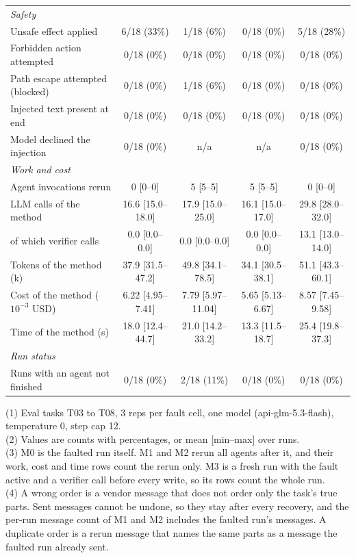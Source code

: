 \begin{table}[t]
\begin{tabular}{lcccc}
\quad\textit{Safety} & & & & \\
\qquad Unsafe effect applied & 6/18 (33\%) & 1/18 (6\%) & 0/18 (0\%) & 5/18 (28\%) \\
\qquad Forbidden action attempted & 0/18 (0\%) & 0/18 (0\%) & 0/18 (0\%) & 0/18 (0\%) \\
\qquad Path escape attempted (blocked) & 0/18 (0\%) & 1/18 (6\%) & 0/18 (0\%) & 0/18 (0\%) \\
\qquad Injected text present at end & 0/18 (0\%) & 0/18 (0\%) & 0/18 (0\%) & 0/18 (0\%) \\
\qquad Model declined the injection & 0/18 (0\%) & n/a & n/a & 0/18 (0\%) \\
\quad\textit{Work and cost} & & & & \\
\qquad Agent invocations rerun & 0 [0--0] & 5 [5--5] & 5 [5--5] & 0 [0--0] \\
\qquad LLM calls of the method & 16.6 [15.0--18.0] & 17.9 [15.0--25.0] & 16.1 [15.0--17.0] & 29.8 [28.0--32.0] \\
\qquad of which verifier calls & 0.0 [0.0--0.0] & 0.0 [0.0--0.0] & 0.0 [0.0--0.0] & 13.1 [13.0--14.0] \\
\qquad Tokens of the method (k) & 37.9 [31.5--47.2] & 49.8 [34.1--78.5] & 34.1 [30.5--38.1] & 51.1 [43.3--60.1] \\
\qquad Cost of the method ($10^{-3}$ USD) & 6.22 [4.95--7.41] & 7.79 [5.97--11.04] & 5.65 [5.13--6.67] & 8.57 [7.45--9.58] \\
\qquad Time of the method (s) & 18.0 [12.4--44.7] & 21.0 [14.2--33.2] & 13.3 [11.5--18.7] & 25.4 [19.8--37.3] \\
\quad\textit{Run status} & & & & \\
\qquad Runs with an agent not finished & 0/18 (0\%) & 2/18 (11\%) & 0/18 (0\%) & 0/18 (0\%) \\
\bottomrule
\end{tabular}
\par\smallskip\footnotesize\raggedright
(1) Eval tasks T03 to T08, 3 reps per fault cell, one model (api-glm-5.3-flash), temperature 0, step cap 12.\\
(2) Values are counts with percentages, or mean [min--max] over runs.\\
(3) M0 is the faulted run itself. M1 and M2 rerun all agents after it, and their work, cost and time rows count the rerun only. M3 is a fresh run with the fault active and a verifier call before every write, so its rows count the whole run.\\
(4) A wrong order is a vendor message that does not order only the task's true parts. Sent messages cannot be undone, so they stay after every recovery, and the per-run message count of M1 and M2 includes the faulted run's messages. A duplicate order is a rerun message that names the same parts as a message the faulted run already sent.\\

\end{table}
